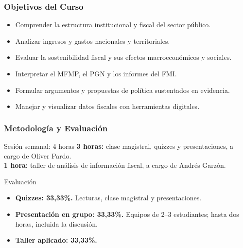 \documentclass{beamer}
\begin{document}
\begin{frame}
  \frametitle{Objetivos del Curso}
  \begin{itemize}
    \item Comprender la estructura institucional y fiscal del sector p\'ublico.
    \item Analizar ingresos y gastos nacionales y territoriales.
    \item Evaluar la sostenibilidad fiscal y sus efectos macroecon\'omicos y sociales.
    \item Interpretar el MFMP, el PGN y los informes del FMI.
    \item Formular argumentos y propuestas de pol\'itica sustentados en evidencia.
    \item Manejar y visualizar datos fiscales con herramientas digitales.
  \end{itemize}
\end{frame}

\begin{frame}
  \frametitle{Metodolog\'ia y Evaluaci\'on}
  \begin{block}{Sesi\'on semanal: 4 horas}
    \textbf{3 horas:} clase magistral, quizzes y presentaciones, a cargo de Oliver Pardo.\\
    \textbf{1 hora:} taller de an\'alisis de informaci\'on fiscal, a cargo de Andr\'es Garz\'on.
  \end{block}
  \begin{alertblock}{Evaluaci\'on}
    \begin{itemize}
      \item \textbf{Quizzes: 33,33\%.} Lecturas, clase magistral y presentaciones.
      \item \textbf{Presentaci\'on en grupo: 33,33\%.} Equipos de 2--3 estudiantes; hasta dos horas, incluida la discusi\'on.
      \item \textbf{Taller aplicado: 33,33\%.}
    \end{itemize}
  \end{alertblock}
\end{frame}
\end{document}
